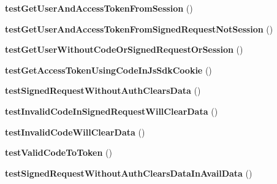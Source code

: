 \begin{DoxyCompactItemize}
\item 
\hypertarget{class_p_h_p_s_d_k_test_case_a31993eaf1a1b6cea09da9083711be7a7}{{\bfseries test\-Get\-User\-And\-Access\-Token\-From\-Session} ()}\label{class_p_h_p_s_d_k_test_case_a31993eaf1a1b6cea09da9083711be7a7}

\item 
\hypertarget{class_p_h_p_s_d_k_test_case_aaf06ef7c64ebd04e21e823bc47ac66ad}{{\bfseries test\-Get\-User\-And\-Access\-Token\-From\-Signed\-Request\-Not\-Session} ()}\label{class_p_h_p_s_d_k_test_case_aaf06ef7c64ebd04e21e823bc47ac66ad}

\item 
\hypertarget{class_p_h_p_s_d_k_test_case_a4ce79268bc95a4770f516146342d4de6}{{\bfseries test\-Get\-User\-Without\-Code\-Or\-Signed\-Request\-Or\-Session} ()}\label{class_p_h_p_s_d_k_test_case_a4ce79268bc95a4770f516146342d4de6}

\item 
\hypertarget{class_p_h_p_s_d_k_test_case_ae987e0b62b3d5e4819091d35236d3a8e}{{\bfseries test\-Get\-Access\-Token\-Using\-Code\-In\-Js\-Sdk\-Cookie} ()}\label{class_p_h_p_s_d_k_test_case_ae987e0b62b3d5e4819091d35236d3a8e}

\item 
\hypertarget{class_p_h_p_s_d_k_test_case_a50cee50d4f7c9573224160f00f64fb82}{{\bfseries test\-Signed\-Request\-Without\-Auth\-Clears\-Data} ()}\label{class_p_h_p_s_d_k_test_case_a50cee50d4f7c9573224160f00f64fb82}

\item 
\hypertarget{class_p_h_p_s_d_k_test_case_a26cce1bb64df5dd838f065cbdfc24bcb}{{\bfseries test\-Invalid\-Code\-In\-Signed\-Request\-Will\-Clear\-Data} ()}\label{class_p_h_p_s_d_k_test_case_a26cce1bb64df5dd838f065cbdfc24bcb}

\item 
\hypertarget{class_p_h_p_s_d_k_test_case_a14d0d44499076640f42a05dc38063ac8}{{\bfseries test\-Invalid\-Code\-Will\-Clear\-Data} ()}\label{class_p_h_p_s_d_k_test_case_a14d0d44499076640f42a05dc38063ac8}

\item 
\hypertarget{class_p_h_p_s_d_k_test_case_a7e1ba2ad30faa3c8099d1b8ec41c1002}{{\bfseries test\-Valid\-Code\-To\-Token} ()}\label{class_p_h_p_s_d_k_test_case_a7e1ba2ad30faa3c8099d1b8ec41c1002}

\item 
\hypertarget{class_p_h_p_s_d_k_test_case_a62b672cb97223656c263e9794cebb8d7}{{\bfseries test\-Signed\-Request\-Without\-Auth\-Clears\-Data\-In\-Avail\-Data} ()}\label{class_p_h_p_s_d_k_test_case_a62b672cb97223656c263e9794cebb8d7}


\end{DoxyCompactItemize}
